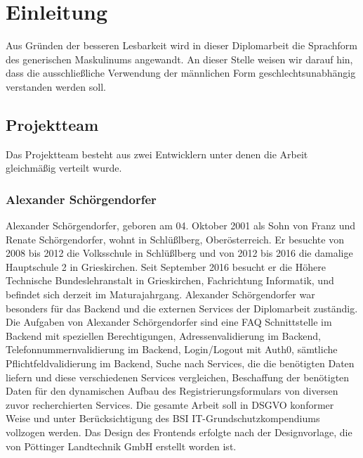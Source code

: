 \chapter{Einleitung} \label{sec:einleitung}
Aus Gründen der besseren Lesbarkeit wird in dieser Diplomarbeit die Sprachform des generischen Maskulinums angewandt. An dieser Stelle weisen wir darauf hin, dass die ausschließliche Verwendung der männlichen Form geschlechtsunabhängig verstanden werden soll.
\section{Projektteam}
Das Projektteam besteht aus zwei Entwicklern unter denen die Arbeit gleichmäßig verteilt wurde.
\subsection{Alexander Schörgendorfer}
Alexander Schörgendorfer, geboren am 04. Oktober 2001 als Sohn von Franz und Renate Schörgendorfer, wohnt in Schlüßlberg, Oberösterreich. Er besuchte von 2008 bis 2012 die Volksschule in Schlüßlberg und von 2012 bis 2016 die damalige Hauptschule 2 in Grieskirchen. Seit September 2016 besucht er die Höhere Technische Bundeslehranstalt in Grieskirchen, Fachrichtung Informatik, und befindet sich derzeit im Maturajahrgang. Alexander Schörgendorfer war besonders für das Backend und die externen Services der Diplomarbeit zuständig.\\
Die Aufgaben von Alexander Schörgendorfer sind eine FAQ Schnittstelle im Backend mit speziellen Berechtigungen, Adressenvalidierung im Backend, Telefonnummernvalidierung im Backend, Login/Logout mit Auth0, sämtliche Pflichtfeldvalidierung im Backend, Suche nach Services, die die benötigten Daten liefern und diese verschiedenen Services vergleichen, Beschaffung der benötigten Daten für den dynamischen Aufbau des Registrierungsformulars von diversen zuvor recherchierten Services. Die gesamte Arbeit soll in DSGVO konformer Weise und unter Berücksichtigung des BSI IT-Grundschutzkompendiums vollzogen werden. Das Design des Frontends erfolgte nach der Designvorlage, die von Pöttinger Landtechnik GmbH erstellt worden ist.

